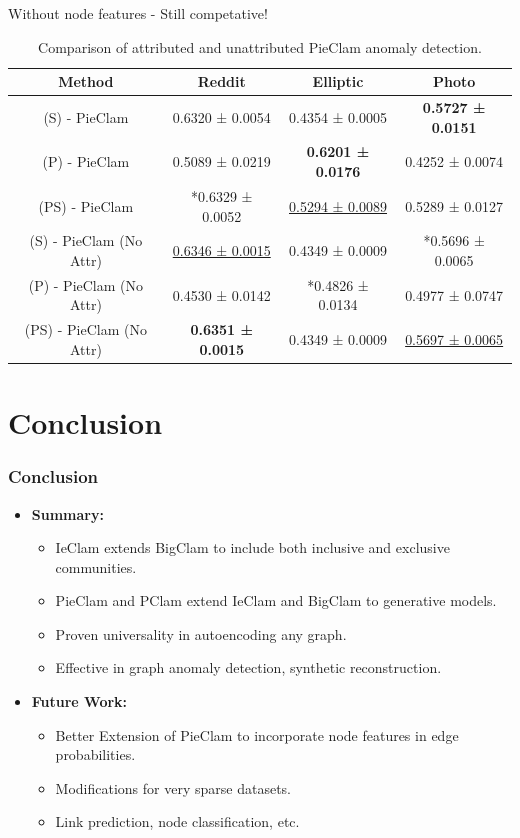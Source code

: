\documentclass{beamer}
\begin{document}
\begin{frame}
\Large
Without node features - Still competative!
\begin{table}
\scriptsize
\centering
\begin{tabular}{|c|c|c|c|}
    \hline
  Method  & Reddit & Elliptic & Photo \\
    \hline
  (S) - PieClam & 0.6320 ± 0.0054 & 0.4354 ± 0.0005 & \textbf{0.5727 ± 0.0151} \\
  (P) - PieClam & 0.5089 ± 0.0219 & \textbf{0.6201 ± 0.0176} & 0.4252 ± 0.0074 \\
  (PS) - PieClam & *0.6329 ± 0.0052 & \underline{0.5294 ± 0.0089} & 0.5289 ± 0.0127 \\
    \hline
  (S) - PieClam (No Attr) & \underline{0.6346 ± 0.0015} & 0.4349 ± 0.0009 & *0.5696 ± 0.0065 \\
  (P) - PieClam (No Attr) & 0.4530 ± 0.0142 & *0.4826 ± 0.0134 & 0.4977 ± 0.0747 \\
  (PS) - PieClam (No Attr) & \textbf{0.6351 ± 0.0015} & 0.4349 ± 0.0009 & \underline{0.5697 ± 0.0065} \\
    \hline
\end{tabular}
\caption{Comparison of attributed and unattributed PieClam anomaly detection.}
\label{Table22}
\end{table}
    
\end{frame}

\section{Conclusion}

\begin{frame}
\frametitle{Conclusion}
\begin{itemize}[itemsep=1em, label=\textbullet]
    \item \textbf{Summary:}
    \begin{itemize}[itemsep=1em, label=\textbullet]
        \item IeClam extends BigClam to include both inclusive and exclusive communities.
        \item PieClam and PClam extend IeClam and BigClam to generative models.
        \item Proven universality in autoencoding any graph.
        \item Effective in graph anomaly detection, synthetic reconstruction.
    \end{itemize}
    \item \textbf{Future Work:}
    \begin{itemize}[itemsep=1em, label=\textbullet]
        \item Better Extension of PieClam to incorporate node features in edge probabilities.
        \item Modifications for very sparse datasets.
        \item Link prediction, node classification, etc.

    \end{itemize}
\end{itemize}
\end{frame}
\end{document}
